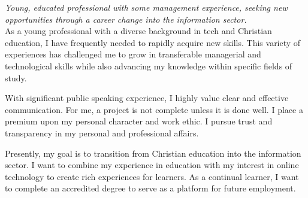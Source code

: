 
\vspace{-1.3em} %

\begin{multicols}{2}  %
\noindent \textit{Young, educated professional with some management experience, seeking new opportunities through a career change into the information sector.}\\

As a young professional with a diverse background in tech and Christian education, I have frequently needed to rapidly acquire new skills. This variety of experiences has challenged me to grow in transferable managerial and technological skills while also advancing my knowledge within specific fields of study.

With significant public speaking experience, I highly value clear and effective communication. For me, a project is not complete unless it is done well. I place a premium upon my personal character and work ethic. I pursue trust and transparency in my personal and professional affairs.

Presently, my goal is to transition from Christian education into the information sector. I want to combine my experience in education with my interest in online technology to create rich experiences for learners. As a continual learner, I want to complete an  accredited  degree to serve as a platform for future employment.

\end{multicols}

